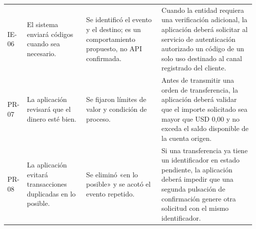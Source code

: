 \documentclass[conference,a4paper]{IEEEtran}
\begin{document}
\begin{table}[!t]
\begin{tabularx}{\textwidth}{@{}p{0.70cm}p{3.45cm}p{3.45cm}Y@{}}
IE-06 & El sistema enviará códigos cuando sea necesario. & Se identificó el evento y el destino; es un comportamiento propuesto, no API confirmada. & Cuando la entidad requiera una verificación adicional, la aplicación deberá solicitar al servicio de autenticación autorizado un código de un solo uso destinado al canal registrado del cliente. \\
PR-07 & La aplicación revisará que el dinero esté bien. & Se fijaron límites de valor y condición de proceso. & Antes de transmitir una orden de transferencia, la aplicación deberá validar que el importe solicitado sea mayor que USD 0,00 y no exceda el saldo disponible de la cuenta origen. \\
PR-08 & La aplicación evitará transacciones duplicadas en lo posible. & Se eliminó «en lo posible» y se acotó el evento repetido. & Si una transferencia ya tiene un identificador en estado pendiente, la aplicación deberá impedir que una segunda pulsación de confirmación genere otra solicitud con el mismo identificador. \\
\bottomrule
\end{tabularx}
\end{table}
\end{document}
